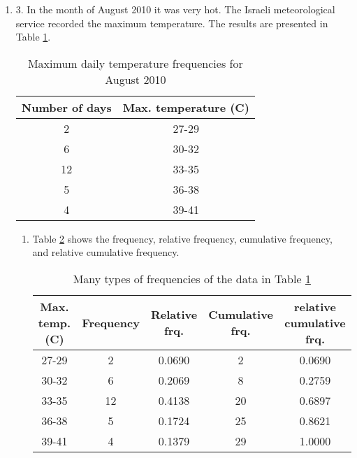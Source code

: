 \documentclass[fleqn]{article}
\newenvironment{answers}{ %
	\begin{enumerate}
		\setlength{\itemsep}{\bigskipamount}
}{\end{enumerate}}
\begin{document}
\begin{answers}
	\item[3.]
	In the month of August 2010 it was very hot. The Israeli meteorological service recorded the maximum temperature. The results are presented in Table \ref{q3-temperature}.
	\begin{table}
		\centering
		\begin{tabular}{||c|c||}
			\hline
			Number of days & Max. temperature (\degree C) \\
			\hline
			2	& 27-29 \\
			6	& 30-32 \\
			12	& 33-35 \\
			5	& 36-38 \\
			4	& 39-41 \\
			\hline
		\end{tabular}
		\caption{Maximum daily temperature frequencies for August 2010}
		\label{q3-temperature}
	\end{table}
	\begin{enumerate}
		\item %
		Table \ref{q3-frequencies} shows the frequency, relative frequency, cumulative frequency, and relative cumulative frequency.
		\begin{table}[h]
			\centering
			\begin{tabular}{||c||c|c|c|c||}
				\hline
				Max. temp. (\degree C) & Frequency & Relative frq. & Cumulative frq. & relative cumulative frq. \\
				\hline
				27-29 & 2	& 0.0690 & 2	& 0.0690 \\
				30-32 & 6	& 0.2069 & 8	& 0.2759 \\
				33-35 & 12	& 0.4138 & 20	& 0.6897 \\
				36-38 & 5	& 0.1724 & 25	& 0.8621 \\
				39-41 & 4	& 0.1379 & 29	& 1.0000 \\
				\hline
			\end{tabular}
			\caption{Many types of frequencies of the data in Table \ref{q3-temperature}}
			\label{q3-frequencies}
		\end{table}


\end{enumerate}
\end{answers}
\end{document}
